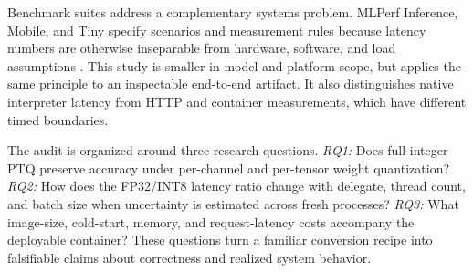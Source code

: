 Benchmark suites address a complementary systems problem. MLPerf Inference, Mobile, and Tiny specify scenarios and measurement rules because latency numbers are otherwise inseparable from hardware, software, and load assumptions \cite{reddi2020mlperf,reddi2020mobile,banbury2021mlperf}. This study is smaller in model and platform scope, but applies the same principle to an inspectable end-to-end artifact. It also distinguishes native interpreter latency from HTTP and container measurements, which have different timed boundaries.

The audit is organized around three research questions. \emph{RQ1:} Does full-integer PTQ preserve accuracy under per-channel and per-tensor weight quantization? \emph{RQ2:} How does the FP32/INT8 latency ratio change with delegate, thread count, and batch size when uncertainty is estimated across fresh processes? \emph{RQ3:} What image-size, cold-start, memory, and request-latency costs accompany the deployable container? These questions turn a familiar conversion recipe into falsifiable claims about correctness and realized system behavior.
